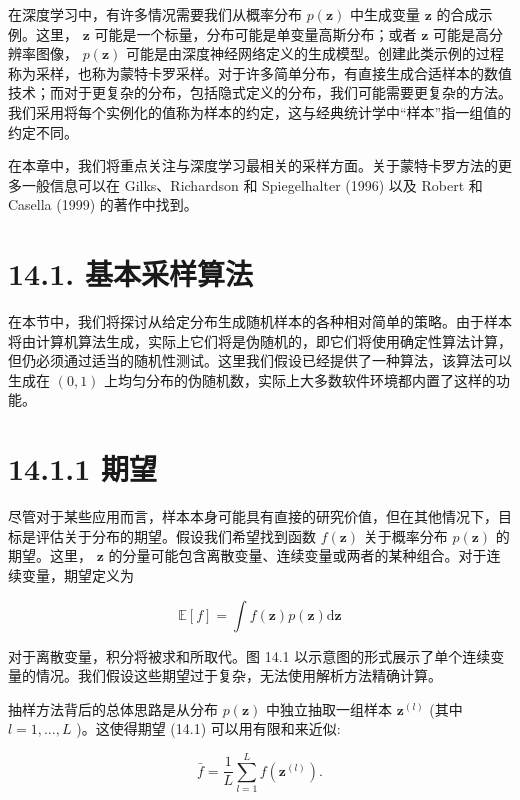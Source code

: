 \documentclass[10pt]{report}
\begin{document}
在深度学习中，有许多情况需要我们从概率分布 \(p\left( \mathbf{z}\right)\) 中生成变量 \(\mathbf{z}\) 的合成示例。这里， \(\mathbf{z}\) 可能是一个标量，分布可能是单变量高斯分布；或者 \(\mathbf{z}\) 可能是高分辨率图像， \(p\left( \mathbf{z}\right)\) 可能是由深度神经网络定义的生成模型。创建此类示例的过程称为采样，也称为蒙特卡罗采样。对于许多简单分布，有直接生成合适样本的数值技术；而对于更复杂的分布，包括隐式定义的分布，我们可能需要更复杂的方法。我们采用将每个实例化的值称为样本的约定，这与经典统计学中“样本”指一组值的约定不同。

在本章中，我们将重点关注与深度学习最相关的采样方面。关于蒙特卡罗方法的更多一般信息可以在 Gilks、Richardson 和 Spiegelhalter (1996) 以及 Robert 和 Casella (1999) 的著作中找到。

\section*{14.1. 基本采样算法}

在本节中，我们将探讨从给定分布生成随机样本的各种相对简单的策略。由于样本将由计算机算法生成，实际上它们将是伪随机的，即它们将使用确定性算法计算，但仍必须通过适当的随机性测试。这里我们假设已经提供了一种算法，该算法可以生成在 \(\left( {0,1}\right)\) 上均匀分布的伪随机数，实际上大多数软件环境都内置了这样的功能。

\section*{14.1.1 期望}

尽管对于某些应用而言，样本本身可能具有直接的研究价值，但在其他情况下，目标是评估关于分布的期望。假设我们希望找到函数 \(f\left( \mathbf{z}\right)\) 关于概率分布 \(p\left( \mathbf{z}\right)\) 的期望。这里， \(\mathbf{z}\) 的分量可能包含离散变量、连续变量或两者的某种组合。对于连续变量，期望定义为

\[
\mathbb{E}\left\lbrack  f\right\rbrack   = \int f\left( \mathbf{z}\right) p\left( \mathbf{z}\right) \mathrm{d}\mathbf{z} \tag{14.1}
\]

对于离散变量，积分将被求和所取代。图 14.1 以示意图的形式展示了单个连续变量的情况。我们假设这些期望过于复杂，无法使用解析方法精确计算。

抽样方法背后的总体思路是从分布 \(p\left( \mathbf{z}\right)\) 中独立抽取一组样本 \({\mathbf{z}}^{\left( l\right) }\) (其中 \(l = 1,\ldots ,L\) )。这使得期望 (14.1) 可以用有限和来近似:

\[
\bar{f} = \frac{1}{L}\mathop{\sum }\limits_{{l = 1}}^{L}f\left( {\mathbf{z}}^{\left( l\right) }\right) . \tag{14.2}
\]
\end{document}
